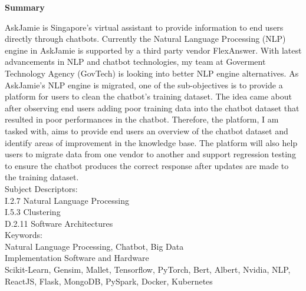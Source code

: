 \begin{center}
	\Large\textbf{Summary}
\end{center}
\noindent
AskJamie is Singapore's virtual assistant to provide information to end users directly through chatbots. Currently the Natural Language Processing (NLP) engine in AskJamie is supported by a third party vendor FlexAnswer. With latest advancements in NLP and chatbot technologies, my team at Goverment Technology Agency (GovTech) is looking into better NLP engine alternatives. As AskJamie's NLP engine is migrated, one of the sub-objectives is to provide a platform for users to clean the chatbot's training dataset. The idea came about after observing end users adding poor training data into the chatbot dataset that resulted in poor performances in the chatbot. Therefore, the platform, I am tasked with, aims to provide end users an overview of the chatbot dataset and identify areas of improvement in the knowledge base. The platform will also help users to migrate data from one vendor to another and support regression testing to ensure the chatbot produces the correct response after updates are made to the training dataset. \\

\noindent
Subject Descriptors:\\
\indent I.2.7 Natural Language Processing\\
\indent I.5.3 Clustering\\
\indent D.2.11 Software Architectures\\

\noindent
Keywords:\\
\indent Natural Language Processing, Chatbot, Big Data\\

\noindent
Implementation Software and Hardware\\
\indent Scikit-Learn, Gensim, Mallet, Tensorflow, PyTorch, Bert, Albert, Nvidia, NLP, ReactJS, Flask, MongoDB, PySpark, Docker, Kubernetes\\